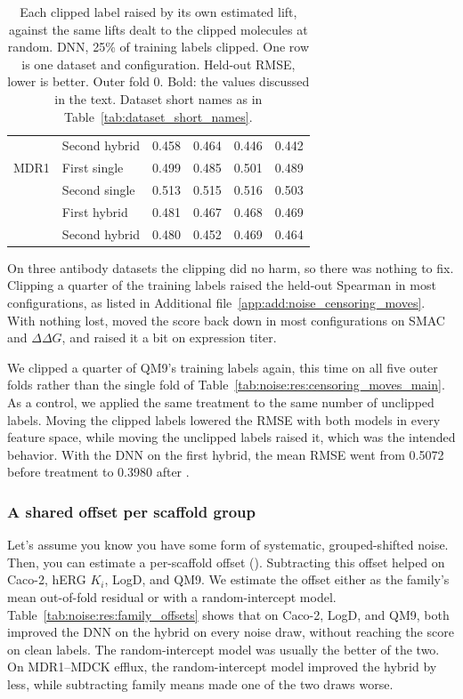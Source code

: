 \begin{table}[htbp]
\begin{tabular}{@{}llrrrr@{}}
 & Second hybrid & 0.458 & 0.464 & 0.446 & 0.442 \\
MDR1 & First single & 0.499 & 0.485 & 0.501 & 0.489 \\
 & Second single & 0.513 & 0.515 & 0.516 & 0.503 \\
 & First hybrid & 0.481 & 0.467 & 0.468 & 0.469 \\
 & Second hybrid & 0.480 & 0.452 & 0.469 & 0.464 \\
\bottomrule
\end{tabular}
\caption[Per-molecule lift against shuffled lifts.]{Each clipped label raised by its own estimated lift, against the same lifts dealt to the clipped molecules at random. DNN, 25\% of training labels clipped. One row is one dataset and configuration. Held-out RMSE, lower is better. Outer fold 0. Bold: the values discussed in the text. Dataset short names as in Table~\ref{tab:dataset_short_names}.}
\label{tab:noise:res:censoring_lift}
\end{table}

On three antibody datasets the clipping did no harm, so there was nothing to fix. Clipping a quarter of the training labels raised the held-out Spearman in most configurations, as listed in Additional file~\ref{app:add:noise_censoring_moves}. With nothing lost,  moved the score back down in most configurations on SMAC and $\Delta\Delta G$, and raised it a bit on expression titer.

We clipped a quarter of QM9's training labels again, this time on all five outer folds rather than the single fold of Table~\ref{tab:noise:res:censoring_moves_main}. As a control, we applied the same treatment to the same number of unclipped labels. Moving the clipped labels lowered the RMSE with both models in every feature space, while moving the unclipped labels raised it, which was the intended behavior. With the DNN on the first hybrid, the mean RMSE went from 0.5072 before treatment to 0.3980 after .

\subsubsection{A shared offset per scaffold group}\label{sec:noise:res:offsets}


Let's assume you know you have some form of systematic, grouped-shifted noise. Then, you can estimate a per-scaffold offset (). Subtracting this offset helped on Caco-2, hERG $K_i$, LogD, and QM9. We estimate the offset either as the family's mean out-of-fold residual or with a random-intercept model. Table~\ref{tab:noise:res:family_offsets} shows that on Caco-2, LogD, and QM9, both improved the DNN on the hybrid on every noise draw, without reaching the score on clean labels. The random-intercept model was usually the better of the two. On MDR1--MDCK efflux, the random-intercept model improved the hybrid by less, while subtracting family means made one of the two draws worse.

